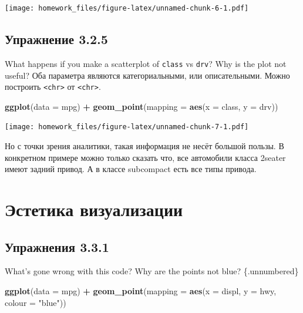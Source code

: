\documentclass[]{book}
\newenvironment{Shaded}{\begin{snugshade}}{\end{snugshade}}
\newcommand{\KeywordTok}[1]{\textcolor[rgb]{0.13,0.29,0.53}{\textbf{#1}}}
\newcommand{\DataTypeTok}[1]{\textcolor[rgb]{0.13,0.29,0.53}{#1}}
\newcommand{\StringTok}[1]{\textcolor[rgb]{0.31,0.60,0.02}{#1}}
\newcommand{\OperatorTok}[1]{\textcolor[rgb]{0.81,0.36,0.00}{\textbf{#1}}}
\newcommand{\NormalTok}[1]{#1}
\begin{document}
\texttt{[image: homework\_files/figure-latex/unnamed-chunk-6-1.pdf]}

\subsection*{Упражнение 3.2.5}\label{-3.2.5}

What happens if you make a scatterplot of \texttt{class} vs
\texttt{drv}? Why is the plot not useful? Оба параметра являются
категориальными, или описательными. Можно построить
\texttt{\textless{}chr\textgreater{}} от
\texttt{\textless{}chr\textgreater{}}.

\begin{Shaded}
\begin{Highlighting}[]
\KeywordTok{ggplot}\NormalTok{(}\DataTypeTok{data =}\NormalTok{ mpg) }\OperatorTok{+}\StringTok{ }\KeywordTok{geom_point}\NormalTok{(}\DataTypeTok{mapping =} \KeywordTok{aes}\NormalTok{(}\DataTypeTok{x =}\NormalTok{ class, }\DataTypeTok{y =}\NormalTok{ drv))}
\end{Highlighting}
\end{Shaded}

\texttt{[image: homework\_files/figure-latex/unnamed-chunk-7-1.pdf]}

Но с точки зрения аналитики, такая информация не несёт большой пользы. В
конкретном примере можно только сказать что, все автомобили класса
2seater имеют задний привод. А в классе subcompact есть все типы
привода.

\section{Эстетика визуализации}\label{-}

\subsection*{Упражнения 3.3.1}\label{-3.3.1}

What's gone wrong with this code? Why are the points not blue?
\{.unnumbered\}

\begin{Shaded}
\begin{Highlighting}[]
\KeywordTok{ggplot}\NormalTok{(}\DataTypeTok{data =}\NormalTok{ mpg) }\OperatorTok{+}
\StringTok{  }\KeywordTok{geom_point}\NormalTok{(}\DataTypeTok{mapping =} \KeywordTok{aes}\NormalTok{(}\DataTypeTok{x =}\NormalTok{ displ, }\DataTypeTok{y =}\NormalTok{ hwy, }\DataTypeTok{colour =} \StringTok{"blue"}\NormalTok{))}
\end{Highlighting}
\end{Shaded}
\end{document}

